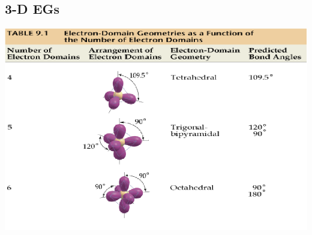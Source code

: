 \documentclass[a4paper, 8pt]{memoir}
\begin{document}
\subsection {3-D EGs}
\includegraphics[scale=0.4]{3dElectronGeos}
\end{document}
